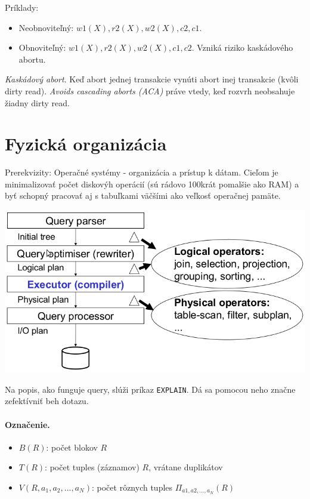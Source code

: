 \documentclass[10pt,a4paper]{article}
\begin{document}
Príklady:
\begin{itemize}
\item Neobnoviteľný: $w1(X), r2(X), w2(X), c2, c1$.
\item Obnoviteľný: $w1(X), r2(X), w2(X), c1, c2$. Vzniká riziko kaskádového abortu.
\end{itemize}

\emph{Kaskádový abort}. Keď abort jednej transakcie vynúti abort inej transakcie (kvôli dirty read).
\emph{Avoids cascading aborts (ACA)} práve vtedy, keď rozvrh neobsahuje žiadny dirty read.


\section{Fyzická organizácia}
\label{fyzicka_organizacia}

Prerekvizity: Operačné systémy - organizácia a prístup k dátam.
Cieľom je minimalizovať počet diskovýh operácií (sú rádovo 100krát pomalšie ako RAM)
a byť schopný pracovať aj s tabuľkami väčšími ako veľkosť operačnej pamäte.

\begin{center}
\includegraphics[scale=0.5]{db_fyzicky_model.png}
\end{center}

Na popis, ako funguje query, slúži príkaz \verb|EXPLAIN|. Dá sa pomocou neho značne zefektívniť beh dotazu.

\paragraph{Označenie.}
\begin{itemize}
\item $B(R)$: počet blokov $R$
\item $T(R)$: počet tuples (záznamov) $R$, vrátane duplikátov
\item $V(R, a_1, a_2, ..., a_N)$: počet rôznych tuples $\Pi_{a1, a2, \ldots, a_N}(R)$
\end{itemize}
\end{document}
